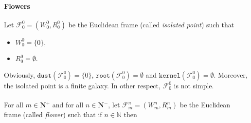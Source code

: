 \documentclass[draft]{article}
\newtheorem{lemma}{Lemma}
\def\N{\mathbb{N}}
\def\dust{\mathtt{dust}}
\def\kernel{\mathtt{kernel}}
\def\root{\mathtt{root}}
\begin{document}
\paragraph{Flowers}
%
%
Let ${\mathcal F}_{0}^{0}{=}(W_{0}^{0},R_{0}^{0})$ be the Euclidean frame (called {\it isolated point}) such that
%
%
\begin{itemize}
%
%
\item $W_{0}^{0}{=}\{0\}$,
%
%
\item $R_{0}^{0}{=}\emptyset$.
%
%
\end{itemize}
%
%
%
%
%
%
%
%
%
%
%
%
%
%
%
%
%
%
%
%
Obviously, $\dust({\mathcal F}_{0}^{0}){=}\{0\}$, $\root({\mathcal F}_{0}^{0}){=}\emptyset$ and $\kernel({\mathcal F}_{0}^{0}){=}\emptyset$.
%
%
%
%
%
%
Moreover, the isolated point is a finite galaxy.
%
%
%
%
%
%
In other respect, ${\mathcal F}_{0}^{0}$ is not simple.
%
%
\\
\\
%
%
For all $m{\in}\mathbf{N}^{+}$ and for all $n{\in}\mathbf{N}^{-}$, let ${\mathcal F}_{m}^{n}{=}(W_{m}^{n},R_{m}^{n})$ be the Euclidean frame (called {\it flower}) such that if $n{\in}\N$ then
\end{document}
